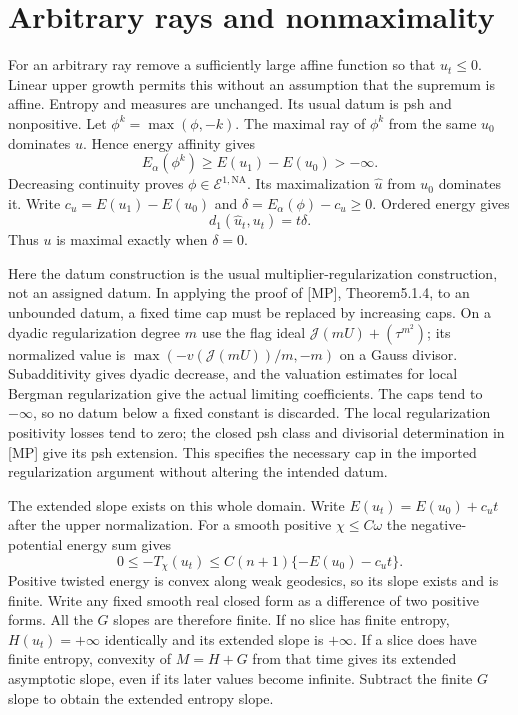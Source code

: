 \documentclass[11pt]{article}
\newcommand{\NA}{\mathrm{NA}}
\newcommand{\J}{\mathcal J}
\begin{document}
\section{Arbitrary rays and nonmaximality}
For an arbitrary ray remove a sufficiently large affine function
so that $u_t\leq0$. Linear upper growth permits this without an
assumption that the supremum is affine. Entropy and measures are
unchanged. Its usual datum is psh and nonpositive.
Let $\phi^k=\max(\phi,-k)$. The maximal ray of $\phi^k$ from
the same $u_0$ dominates $u$. Hence energy affinity gives
\[
 E_\alpha(\phi^k)\geq E(u_1)-E(u_0)>-\infty.
\]
Decreasing continuity proves $\phi\in\mathcal E^{1,\NA}$.
Its maximalization $\widehat u$ from $u_0$ dominates it.
Write $c_u=E(u_1)-E(u_0)$ and
$\delta=E_\alpha(\phi)-c_u\geq0$. Ordered energy gives
\[
 d_1(\widehat u_t,u_t)=t\delta.
                                                               \tag{22}
\]
Thus $u$ is maximal exactly when $\delta=0$.

Here the datum construction is the usual multiplier-regularization
construction, not an assigned datum. In applying the proof of [MP],
Theorem5.1.4, to an unbounded datum, a fixed time cap must be
replaced by increasing caps. On a dyadic regularization degree $m$
use the flag ideal $\J(mU)+(\tau^{m^2})$; its normalized value is
$\max(-v(\J(mU))/m,-m)$ on a Gauss divisor. Subadditivity gives
dyadic decrease, and the valuation estimates for local Bergman
regularization give the actual limiting coefficients. The caps tend
to $-\infty$, so no datum below a fixed constant is discarded.
The local regularization positivity losses tend to zero; the closed
psh class and divisorial determination in [MP] give its psh extension.
This specifies the necessary cap in the imported regularization
argument without altering the intended datum.

The extended slope exists on this whole domain. Write
$E(u_t)=E(u_0)+c_u t$ after the upper normalization. For a smooth
positive $\chi\leq C\omega$ the negative-potential energy sum gives
\[
 0\leq-T_\chi(u_t)\leq C(n+1)\{-E(u_0)-c_u t\}.
\]
Positive twisted energy is convex along weak geodesics, so its slope
exists and is finite. Write any fixed smooth real closed form as a
difference of two positive forms. All the $G$ slopes are therefore
finite. If no slice has finite entropy, $H(u_t)=+\infty$ identically
and its extended slope is $+\infty$. If a slice does have finite
entropy, convexity of $M=H+G$ from that time gives its extended
asymptotic slope, even if its later values become infinite. Subtract
the finite $G$ slope to obtain the extended entropy slope.
\end{document}
